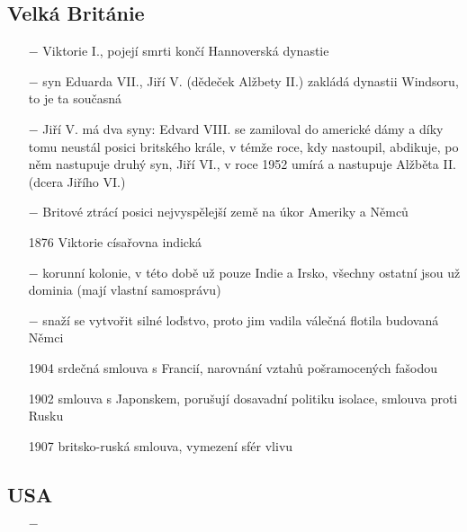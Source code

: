 \documentclass{article}
\begin{document}
\subsection*{Velká Británie}
\begin{itemize}
    \vspace{-0.5em}
    \setlength\itemsep{0.15em}
    \item[$-$] Viktorie I., pojejí smrti končí Hannoverská dynastie
    \item[$-$] syn Eduarda VII., Jiří V. (dědeček Alžbety II.) zakládá dynastii Windsoru, to je ta současná
    \item[$-$] Jiří V. má dva syny: Edvard VIII. se zamiloval do americké dámy a díky tomu neustál posici britského krále, v témže roce, kdy nastoupil, abdikuje, po něm nastupuje druhý syn, Jiří VI., v roce 1952 umírá a nastupuje Alžběta II. (dcera Jiřího VI.)
    \item[$-$] Britové ztrácí posici nejvyspělejší země na úkor Ameriky a Němců
    \item[1876] Viktorie císařovna indická
    \item[$-$] korunní kolonie, v této době už pouze Indie a Irsko, všechny ostatní jsou už dominia (mají vlastní samosprávu)
    \item[$-$] snaží se vytvořit silné loďstvo, proto jim vadila válečná flotila budovaná Němci
    \item[1904] srdečná smlouva s Francií, narovnání vztahů pošramocených fašodou
    \item[1902] smlouva s Japonskem, porušují dosavadní politiku isolace, smlouva proti Rusku
    \item[1907] britsko-ruská smlouva, vymezení sfér vlivu
\end{itemize}

\subsection*{USA}
\begin{itemize}
    \vspace{-0.5em}
    \setlength\itemsep{0.15em}
    \item[$-$]
\end{itemize}
\end{document}
